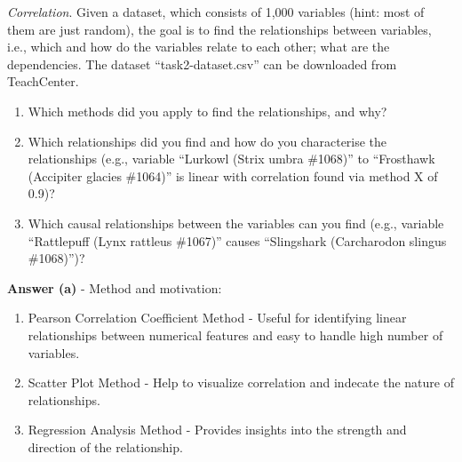 \documentclass[a4paper,10pt]{article}\setlength{\textheight}{10in}\setlength{\textwidth}{6.5in}\setlength{\topmargin}{-0.125in}\setlength{\oddsidemargin}{-.2in}\setlength{\evensidemargin}{-.2in}\setlength{\headsep}{0.2in}\setlength{\footskip}{0pt}\usepackage{amsmath}\usepackage{fancyhdr}\usepackage{enumitem}\usepackage{hyperref}\usepackage{xcolor}\usepackage{graphicx}\usepackage[export]{adjustbox}\usepackage{caption}\usepackage{float}\usepackage{booktabs}\usepackage{makecell}\pagestyle{fancy}
\begin{document}
\begin{enumerate}[topsep=0mm, partopsep=0mm, leftmargin=*]
\clearpage
{\color{blue}
\newpage\item\textit{Correlation}. Given a dataset, which consists of 1,000 variables (hint: most of them are just random), the goal is to find the relationships between variables, i.e., which and how do the variables relate to each other; what are the dependencies.
The dataset ``task2-dataset.csv'' can be downloaded from TeachCenter.
\begin{enumerate}
	\item Which methods did you apply to find the relationships, and why?
	\item Which relationships did you find and how do you characterise the relationships (e.g., variable ``Lurkowl (Strix umbra \#1068)'' to ``Frosthawk (Accipiter glacies \#1064)'' is linear with correlation found via method X of 0.9)?
	\item Which causal relationships between the variables can you find (e.g., variable ``Rattlepuff (Lynx rattleus \#1067)'' causes ``Slingshark (Carcharodon slingus \#1068)'')?
\end{enumerate}
}

\textbf{Answer (a)} - Method and motivation:
    \begin{enumerate}
        \item Pearson Correlation Coefficient Method - Useful for identifying linear relationships between numerical features and easy to handle high number of variables.
        \item Scatter Plot Method - Help to visualize correlation and indecate the nature of relationships.
        \item Regression Analysis Method - Provides insights into the strength and direction of the relationship.
    \end{enumerate}


\end{enumerate}
\end{document}
